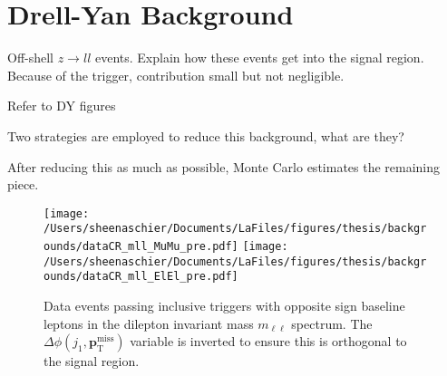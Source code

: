 \section{Drell-Yan Background}
\label{sec:bkg:dy}
Off-shell $z\rightarrow ll$ events.  Explain how these events get into the signal region.  Because of the \met trigger, contribution small but not negligible.

Refer to DY figures

Two strategies are employed to reduce this background, what are they?

After reducing this as much as possible, Monte Carlo estimates the remaining piece.

 \begin{figure}
 \centering
    \texttt{[image: /Users/sheenaschier/Documents/LaFiles/figures/thesis/backgrounds/dataCR\_mll\_MuMu\_pre.pdf]}
 \texttt{[image: /Users/sheenaschier/Documents/LaFiles/figures/thesis/backgrounds/dataCR\_mll\_ElEl\_pre.pdf]}
  \caption{Data events passing inclusive \met{} triggers with opposite sign baseline leptons in the dilepton invariant mass $m_{\ell\ell}$ spectrum. The $\Delta\phi(j_1, \mathbf{p}_\mathrm{    T}^\mathrm{miss})$ variable is inverted to ensure this is orthogonal to the signal region.}
  \label{fig:mll_data}
 \end{figure}
\FloatBarrier

